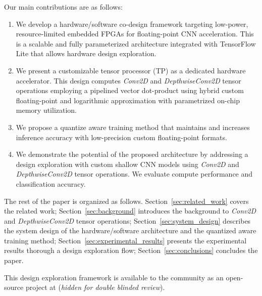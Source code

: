 Our main contributions are as follows:
\begin{enumerate}
	\item We develop a hardware/software co-design framework targeting low-power, resource-limited embedded FPGAs for floating-point CNN acceleration. This is a scalable and fully parameterized architecture integrated with TensorFlow Lite that allows hardware design exploration.
	\item We present a customizable tensor processor (TP) as a dedicated hardware accelerator. This design computes \emph{Conv2D} and \emph{DepthwiseConv2D} tensor operations employing a pipelined vector dot-product using hybrid custom floating-point and logarithmic approximation with parametrized on-chip memory utilization.
	\item We propose a quantize aware training method that maintains and increases inference accuracy with low-precision custom floating-point formats.
	\item We demonstrate the potential of the proposed architecture by addressing a design exploration with custom shallow CNN models using \emph{Conv2D} and \emph{DepthwiseConv2D} tensor operations. We evaluate compute performance and classification accuracy.
\end{enumerate}

The rest of the paper is organized as follows. Section~\ref{sec:related_work} covers the related work; Section~\ref{sec:background} introduces the background to \emph{Conv2D} and \emph{DepthwiseConv2D} tensor operations; Section~\ref{sec:system_design} describes the system design of the hardware/software architecture and the quantized aware training method; Section~\ref{sec:experimental_results} presents the experimental results thorough a design exploration flow; Section~\ref{sec:conclusions} concludes the paper.

This design exploration framework is available to the community as an open-source project at (\emph{hidden for double blinded review}).